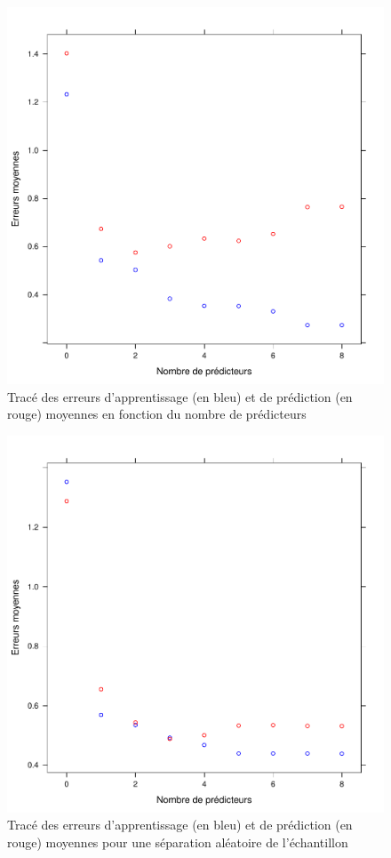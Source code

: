 \documentclass[a4paper, 12pt]{article}
\begin{document}
\begin{enumerate}
\begin{figure}
\begin{center}
\includegraphics[scale=1]{erreurs_moy.pdf}
\caption{Tracé des erreurs d'apprentissage (en bleu) et de prédiction (en rouge) moyennes en fonction du nombre de prédicteurs}
\end{center}
\end{figure}

\begin{figure}
\begin{center}
\includegraphics[scale=1]{erreurs_moy_autre.pdf}
\caption{Tracé des erreurs d'apprentissage (en bleu) et de prédiction (en rouge) moyennes pour une séparation aléatoire de l'échantillon}
\end{center}
\end{figure}


\end{enumerate}
\end{document}
